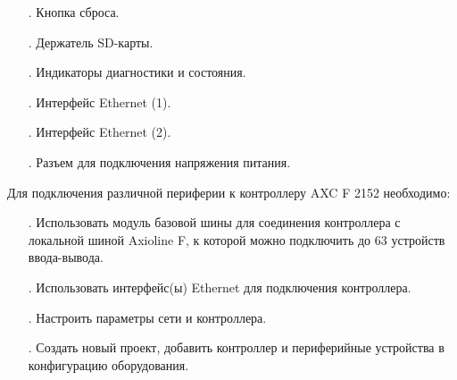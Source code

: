 {\begin{itemize}[leftmargin=2.15cm, labelwidth=0.65cm, labelsep=0.0cm]
		\item[\theitemcntr. ]	Кнопка сброса.
		
		\addtocounter{itemcntr}{1}
		
		\item[\theitemcntr. ] Держатель SD-карты.
		
		\addtocounter{itemcntr}{1}
		
		\item[\theitemcntr. ] Индикаторы диагностики и состояния.
		
		\addtocounter{itemcntr}{1}
		
		\item[\theitemcntr. ] Интерфейс Ethernet (1).
		
		\addtocounter{itemcntr}{1}
		
		\item[\theitemcntr. ] Интерфейс Ethernet (2).
		
		\addtocounter{itemcntr}{1}
		
		\item[\theitemcntr. ] Разъем для подключения напряжения питания.
		
		\addtocounter{itemcntr}{1}
		
		\setcounter{itemcntr}{1}
	\end{itemize}
	
	\par \redline Для подключения различной периферии к контроллеру AXC F 2152 необходимо:
	
	\begin{itemize}[leftmargin=2.15cm, labelwidth=0.65cm, labelsep=0.0cm] 
		
		\item[\theitemcntr. ] Использовать модуль базовой шины для соединения контроллера с локальной шиной Axioline F, к которой можно подключить до 63 устройств ввода-вывода.
		
		\addtocounter{itemcntr}{1}
		
		\item[\theitemcntr. ] Использовать интерфейс(ы) Ethernet для подключения контроллера.
		
		\addtocounter{itemcntr}{1}
		
		\item[\theitemcntr. ] Настроить параметры сети и контроллера.
		
		\addtocounter{itemcntr}{1}
		
		\item[\theitemcntr. ] Создать новый проект, добавить контроллер и периферийные устройства в конфигурацию оборудования.
		

\end{itemize}}
